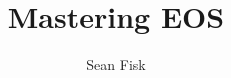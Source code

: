 \documentclass{beamer}
\title{Mastering EOS}
\author[Fisk \& Woodring]{
  Sean Fisk\dotfill\mailtohref{fiskse@mail.gvsu.edu}}
\begin{document}
\begin{frame}[fragile]{}
  \begin{columns}[T]
    \begin{column}{0.33\textwidth}
      
      
      
      
    \end{column}
    \begin{column}{0.33\textwidth}
      
      
      
      
    \end{column}
    \begin{column}{0.33\textwidth}
      
      
      
      
      
    \end{column}
  \end{columns}
\end{frame}
\end{document}
